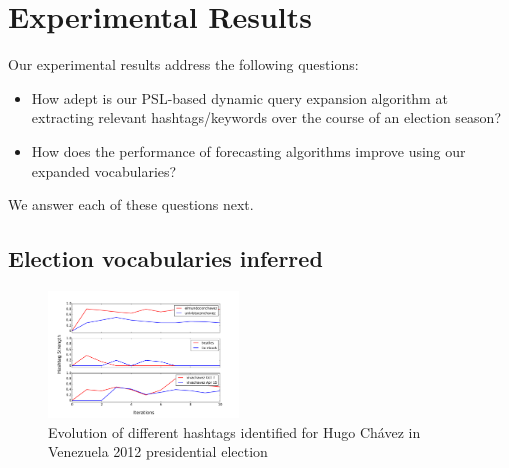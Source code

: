 

\section{Experimental Results}
Our experimental results address the following questions:
\begin{itemize}
\item How adept is our PSL-based dynamic query expansion algorithm at extracting relevant hashtags/keywords over the course
of an election season?
\item How does the performance of forecasting algorithms improve using our expanded vocabularies?
\end{itemize}
We answer each of these questions next.

\subsection{Election vocabularies inferred}

\begin{figure}[Ht]
	\centering
	\includegraphics[width=0.45\textwidth]{support_files/hashTagTimeSeries.pdf}
	\caption{Evolution of different hashtags identified for Hugo Ch\'{a}vez in Venezuela 2012 presidential election}
	\label{fig:timeSeries}
\end{figure}

